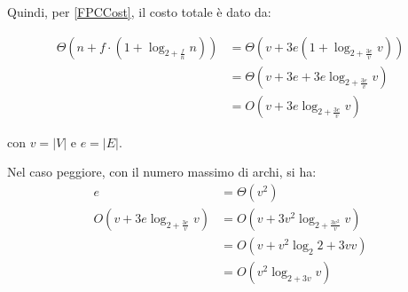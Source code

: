 Quindi, per \eqref{FPCCost}, il costo totale è dato da:

\begin{equation}
    \begin{aligned}
        \Theta(n+f\cdot (1+\log_{2+\frac{f}{n}}n)) & = \Theta(v + 3e ( 1+\log_{2+\frac{3e}{v}}v)) \\
                                                   & = \Theta(v + 3e + 3e\log_{2+\frac{3e}{v}}v) \\
                                                   & = O(v + 3e\log_{2+\frac{3e}{v}}v)
    \end{aligned}
\end{equation}

con $v = |V|$ e $e = |E|$.

Nel caso peggiore, con il numero massimo di archi, si ha:
\begin{equation}
    \begin{aligned}
        e                               & = \Theta(v^2)                         \\
        O(v + 3e\log_{2+\frac{3e}{v}}v) & = O(v + 3v^2\log_{2+\frac{3v^2}{v}}v) \\
                                        & = O(v + v^2\log_2{2+3v}v)             \\
                                        & = O(v^2\log_{2+3v}v)
    \end{aligned}
\end{equation}


